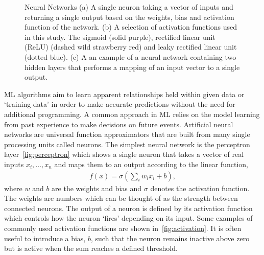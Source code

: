 \documentclass[12pt]{iopart}
\newcommand{\jordan}[1]{\textbf{\textcolor{red}{JORDAN: #1}}}
\newcommand{\chris}[1]{\textbf{\textcolor{green}{CHRIS: #1}}}
\begin{document}
\begin{figure}[h!]
\caption{Neural Networks (a) A single neuron taking a vector of inputs and
returning a single output based on the weights, bias and activation function
of the network. (b) A selection of activation functions used in this study. The sigmoid (solid purple), rectified linear unit (ReLU) \cite{relu} (dashed wild strawberry red) and leaky rectified linear unit \cite{Maas2013RectifierNI} (dotted blue). (c)
A an example of a neural network containing two hidden layers that performs a
mapping of an input vector to a single output.}
\end{figure}
%
%

\ac{ML} algorithms aim to learn apparent relationships held within given data or `training
data' in order to make accurate predictions without the need for additional
programming. A common approach in \ac{ML} relies on the model learning from
past experience to make decisions on future events. Artificial neural networks are universal function approximators that are built from many single
processing units called neurons. The simplest neural network is the perceptron
layer~\cref{fig:perceptron} which shows a single neuron that takes a vector of real
inputs $x_{i},\ldots, x_{n}$
and maps them to an output according to the linear function, 
%
\begin{align}
f(x) = \sigma(\sum_i w_i x_i + b),
\label{eqn:neuron}
\end{align}
%
where $w$ and $b$ are the weights and bias and $\sigma$ denotes the activation function. The weights are numbers which can be thought of as the strength between connected neurons. The output of a neuron is defined by its activation function which controls how the neuron `fires' depending on its input. Some examples of commonly used activation functions are shown in~\cref{fig:activation}. It is often useful to introduce a bias, $b$, such that the neuron remains inactive above zero but is active when the sum reaches a defined threshold. 
\end{document}
